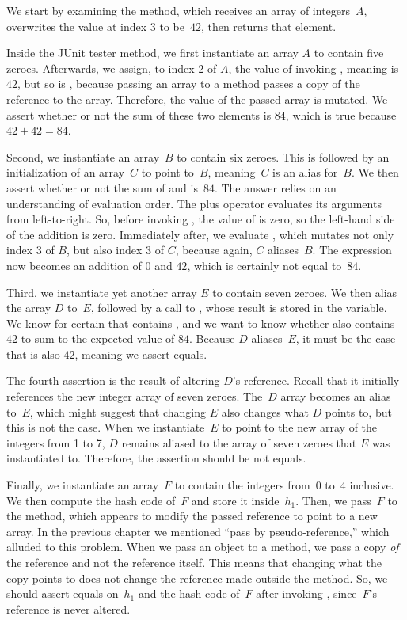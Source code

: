 We start by examining the  method, which receives an array of integers~$A$, overwrites the value at index $3$ to be~$42$, then returns that element. 

Inside the JUnit tester method, we first instantiate an array $A$ to contain five zeroes. Afterwards, we assign, to index 2 of $A$, the value of invoking , meaning  is $42$, but so is , because passing an array to a method passes a copy of the reference to the array. Therefore, the value of the passed array is mutated. We assert whether or not the sum of these two elements is $84$, which is true because $42+42=84$.

Second, we instantiate an array~$B$ to contain six zeroes. This is followed by an initialization of an array~$C$ to point to~$B$, meaning~$C$ is an alias for~$B$. We then assert whether or not the sum of  and  is~$84$. The answer relies on an understanding of evaluation order. The plus operator evaluates its arguments from left-to-right. So, before invoking , the value of  is zero, so the left-hand side of the addition is zero. Immediately after, we evaluate , which mutates not only index $3$ of $B$, but also index $3$ of $C$, because again, $C$ aliases~$B$. The expression now becomes an addition of $0$ and $42$, which is certainly not equal to~$84$.

Third, we instantiate yet another array $E$ to contain seven zeroes. We then alias the array $D$ to~$E$, followed by a call to , whose result is stored in the  variable. We know for certain that  contains , and we want to know whether  also contains $42$ to sum to the expected value of $84$. Because $D$ aliases~$E$, it must be the case that  is also $42$, meaning we assert equals.

The fourth assertion is the result of altering $D$'s reference. Recall that it initially references the new integer array of seven zeroes. The~$D$ array becomes an alias to~$E$, which might suggest that changing $E$ also changes what $D$ points to, but this is not the case. When we instantiate~$E$ to point to the new array of the integers from 1 to 7, $D$ remains aliased to the array of seven zeroes that $E$ was instantiated to. Therefore, the assertion should be not equals.

Finally, we instantiate an array~$F$ to contain the integers from~$0$ to~$4$ inclusive. We then compute the hash code of~$F$ and store it inside~$h_1$. Then, we pass~$F$ to the  method, which appears to modify the passed reference to point to a new array. In the previous chapter we mentioned ``pass by pseudo-reference,'' which alluded to this problem. When we pass an object to a method, we pass a copy \emph{of} the reference and not the reference itself. This means that changing what the copy points to does not change the reference made outside the method. So, we should assert equals on~$h_1$ and the hash code of~$F$ after invoking , since~$F$'s reference is never altered.

